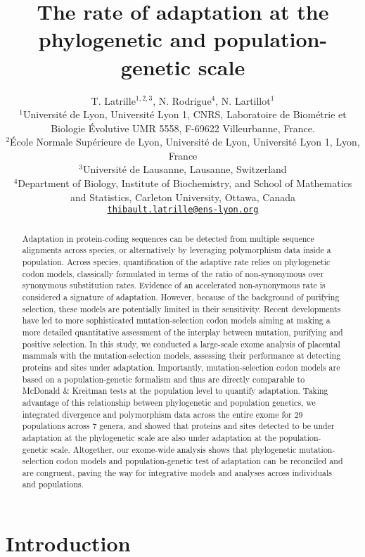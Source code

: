 \documentclass{article}
\title{The rate of adaptation at the phylogenetic and population-genetic scale}
\author{
    \large
    T. {Latrille}$^{1,2,3}$, N. {Rodrigue}$^{4}$, N. {Lartillot}$^{1}$\\
    \normalsize
    $^{1}$Université de Lyon, Université Lyon 1, CNRS, Laboratoire de Biométrie et Biologie Évolutive UMR 5558, F-69622 Villeurbanne, France.\\
    $^{2}$École Normale Supérieure de Lyon, Université de Lyon, Université Lyon 1, Lyon, France\\
    $^{3}$Université de Lausanne, Lausanne, Switzerland\\
    $^{4}$Department of Biology, Institute of Biochemistry, and School of Mathematics and Statistics, Carleton University, Ottawa, Canada \\
    \texttt{\href{mailto:thibault.latrille@ens-lyon.org}{thibault.latrille@ens-lyon.org}} \\
}
\begin{document}
    \maketitle

    \begin{abstract}
        Adaptation in protein-coding sequences can be detected from multiple sequence alignments across species, or alternatively by leveraging polymorphism data inside a population.
        Across species, quantification of the adaptive rate relies on phylogenetic codon models, classically formulated in terms of the ratio of non-synonymous over synonymous substitution rates.
        Evidence of an accelerated non-synonymous rate is considered a signature of adaptation.
        However, because of the background of purifying selection, these models are potentially limited in their sensitivity.
        Recent developments have led to more sophisticated mutation-selection codon models aiming at making a more detailed quantitative assessment of the interplay between mutation, purifying and positive selection.
        In this study, we conducted a large-scale exome analysis of placental mammals with the mutation-selection models, assessing their performance at detecting proteins and sites under adaptation.
        Importantly, mutation-selection codon models are based on a population-genetic formalism and thus are directly comparable to McDonald \& Kreitman tests at the population level to quantify adaptation.
        Taking advantage of this relationship between phylogenetic and population genetics, we integrated divergence and polymorphism data across the entire exome for 29 populations across 7 genera, and showed that proteins and sites detected to be under adaptation at the phylogenetic scale are also under adaptation at the population-genetic scale.
        Altogether, our exome-wide analysis shows that phylogenetic mutation-selection codon models and population-genetic test of adaptation can be reconciled and are congruent, paving the way for integrative models and analyses across individuals and populations.
    \end{abstract}


    \section*{Introduction}
\end{document}
